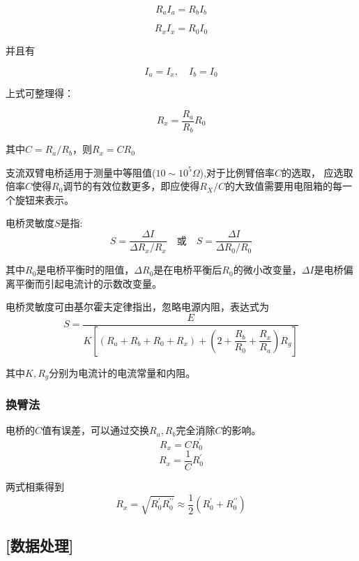 \documentclass[12pt,a4paper,UTF8]{ctexart}
\begin{document}
$$R_aI_a=R_bI_b$$

$$R_xI_x=R_0I_0$$

\par 并且有

$$I_a=I_x,\quad I_b=I_0$$

\par 上式可整理得：

\[R_x=\frac{R_a}{R_b}R_0\]

\par 其中$C=R_a/R_b$，则$R_x=CR_0$
\clearpage
\par 支流双臂电桥适用于测量中等阻值($10\sim 10^5\Omega$),对于比例臂倍率$C$的选取， 应选取倍率$C$使得$R_0$调节的有效位数更多，即应使得$R_X/C$的大致值需要用电阻箱的每一个旋钮来表示。
\par 电桥灵敏度$S$是指:
	\[ S=\frac{\Delta I}{\Delta R_x/R_x}\quad \mbox{或} \quad S=\frac{\Delta I}{\Delta R_0/R_0}\]
	\par 其中$R_0$是电桥平衡时的阻值，$\Delta R_0$是在电桥平衡后$R_0$的微小改变量，$\Delta I$是电桥偏离平衡而引起电流计的示数改变量。
	\par 电桥灵敏度可由基尔霍夫定律指出，忽略电源内阻，表达式为
	\[ S=\frac{E}{K\left[(R_a+R_b+R_0+R_x)+(2+\dfrac{R_b}{R_0}+\dfrac{R_x}{R_a})R_g\right]}\]
	\par 其中$K,R_g$分别为电流计的电流常量和内阻。
	\subsubsection*{换臂法}
	\par 电桥的$C$值有误差，可以通过交换$R_a,R_b$完全消除$C$的影响。
	\[R_x=CR_0^{\prime}\]
	\[R_x=\frac{1}{C}R_0^{\prime}\]
	\par 两式相乘得到
	$$R_x=\sqrt{R_0^{\prime}R_0^{\prime\prime}}\approx \frac{1}{2}(R_0^{\prime}+R_0^{\prime\prime})$$
	\subsection*{[数据处理]}
\end{document}
